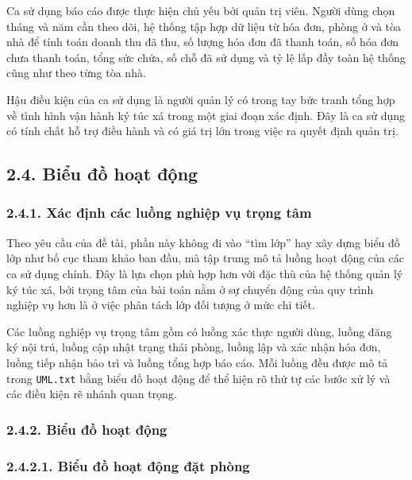 \documentclass[12pt]{article}
\begin{document}
Ca sử dụng báo cáo được thực hiện chủ yếu bởi quản trị viên. Người dùng chọn tháng và năm cần theo dõi, hệ thống tập hợp dữ liệu từ hóa đơn, phòng ở và tòa nhà để tính toán doanh thu đã thu, số lượng hóa đơn đã thanh toán, số hóa đơn chưa thanh toán, tổng sức chứa, số chỗ đã sử dụng và tỷ lệ lấp đầy toàn hệ thống cũng như theo từng tòa nhà.

Hậu điều kiện của ca sử dụng là người quản lý có trong tay bức tranh tổng hợp về tình hình vận hành ký túc xá trong một giai đoạn xác định. Đây là ca sử dụng có tính chất hỗ trợ điều hành và có giá trị lớn trong việc ra quyết định quản trị.

\subsection*{2.4. Biểu đồ hoạt động}

\subsubsection*{2.4.1. Xác định các luồng nghiệp vụ trọng tâm}

Theo yêu cầu của đề tài, phần này không đi vào “tìm lớp” hay xây dựng biểu đồ lớp như bố cục tham khảo ban đầu, mà tập trung mô tả luồng hoạt động của các ca sử dụng chính. Đây là lựa chọn phù hợp hơn với đặc thù của hệ thống quản lý ký túc xá, bởi trọng tâm của bài toán nằm ở sự chuyển động của quy trình nghiệp vụ hơn là ở việc phân tách lớp đối tượng ở mức chi tiết.

Các luồng nghiệp vụ trọng tâm gồm có luồng xác thực người dùng, luồng đăng ký nội trú, luồng cập nhật trạng thái phòng, luồng lập và xác nhận hóa đơn, luồng tiếp nhận bảo trì và luồng tổng hợp báo cáo. Mỗi luồng đều được mô tả trong \texttt{UML.txt} bằng biểu đồ hoạt động để thể hiện rõ thứ tự các bước xử lý và các điều kiện rẽ nhánh quan trọng.

\subsubsection*{2.4.2. Biểu đồ hoạt động}

\subsubsection*{2.4.2.1. Biểu đồ hoạt động đặt phòng}
\end{document}
